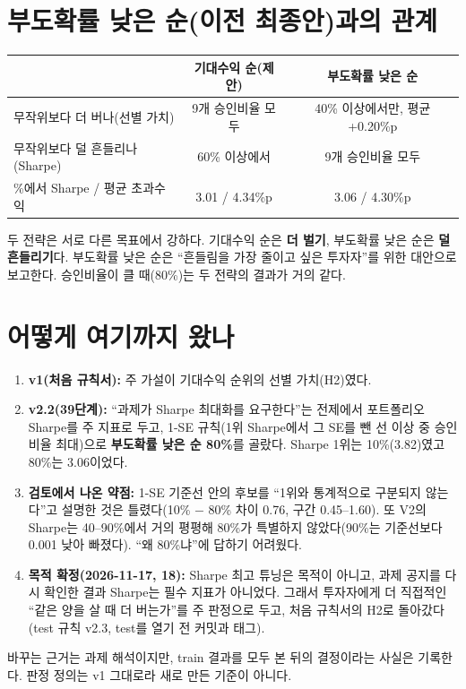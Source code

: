 \section{부도확률 낮은 순(이전 최종안)과의 관계}
\begin{table}[H]\centering\small
\begin{tabularx}{\linewidth}{@{}>{\raggedright\arraybackslash}p{50mm}cc@{}}\toprule
 & \textbf{기대수익 순(제안)} & 부도확률 낮은 순\\\midrule
무작위보다 더 버나(선별 가치) & 9개 승인비율 모두 & 40\% 이상에서만, 평균 +0.20\%p\\
무작위보다 덜 흔들리나(Sharpe) & 60\% 이상에서 & 9개 승인비율 모두\\
80\%에서 Sharpe / 평균 초과수익 & 3.01 / 4.34\%p & 3.06 / 4.30\%p\\\bottomrule
\end{tabularx}
\end{table}
두 전략은 서로 다른 목표에서 강하다. 기대수익 순은 \textbf{더 벌기}, 부도확률 낮은 순은 \textbf{덜 흔들리기}다. 부도확률 낮은 순은 ``흔들림을 가장 줄이고 싶은 투자자''를 위한 대안으로 보고한다. 승인비율이 클 때(80\%)는 두 전략의 결과가 거의 같다.

\section{어떻게 여기까지 왔나}
\begin{enumerate}[leftmargin=*]
\item \textbf{v1(처음 규칙서):} 주 가설이 기대수익 순위의 선별 가치(H2)였다.
\item \textbf{v2.2(39단계):} ``과제가 Sharpe 최대화를 요구한다''는 전제에서 포트폴리오 Sharpe를 주 지표로 두고, 1-SE 규칙(1위 Sharpe에서 그 SE를 뺀 선 이상 중 승인비율 최대)으로 \textbf{부도확률 낮은 순 80\%}를 골랐다. Sharpe 1위는 10\%(3.82)였고 80\%는 3.06이었다.
\item \textbf{검토에서 나온 약점:} 1-SE 기준선 안의 후보를 ``1위와 통계적으로 구분되지 않는다''고 설명한 것은 틀렸다(10\% $-$ 80\% 차이 0.76, 구간 0.45--1.60). 또 V2의 Sharpe는 40--90\%에서 거의 평평해 80\%가 특별하지 않았다(90\%는 기준선보다 0.001 낮아 빠졌다). ``왜 80\%냐''에 답하기 어려웠다.
\item \textbf{목적 확정(2026-11-17, 18):} Sharpe 최고 튜닝은 목적이 아니고, 과제 공지를 다시 확인한 결과 Sharpe는 필수 지표가 아니었다. 그래서 투자자에게 더 직접적인 ``같은 양을 살 때 더 버는가''를 주 판정으로 두고, 처음 규칙서의 H2로 돌아갔다(test 규칙 v2.3, test를 열기 전 커밋과 태그).
\end{enumerate}
바꾸는 근거는 과제 해석이지만, train 결과를 모두 본 뒤의 결정이라는 사실은 기록한다. 판정 정의는 v1 그대로라 새로 만든 기준이 아니다.

